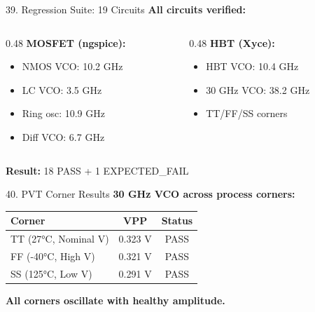 \documentclass[aspectratio=169, 11pt]{beamer}
\begin{document}
\begin{frame}{39. Regression Suite: 19 Circuits}
    \textbf{All circuits verified:}

    \vspace{0.5em}
    \begin{columns}[T]
        \begin{column}{0.48\textwidth}
            \textbf{MOSFET (ngspice):}
            \begin{itemize}
                \item NMOS VCO: 10.2 GHz
                \item LC VCO: 3.5 GHz
                \item Ring osc: 10.9 GHz
                \item Diff VCO: 6.7 GHz
            \end{itemize}
        \end{column}
        \begin{column}{0.48\textwidth}
            \textbf{HBT (Xyce):}
            \begin{itemize}
                \item HBT VCO: 10.4 GHz
                \item 30 GHz VCO: 38.2 GHz
                \item TT/FF/SS corners
            \end{itemize}
        \end{column}
    \end{columns}

    \vspace{0.5em}
    \textbf{Result:} 18 PASS + 1 EXPECTED\_FAIL
\end{frame}

\begin{frame}{40. PVT Corner Results}
    \textbf{30 GHz VCO across process corners:}

    \vspace{0.5em}
    \begin{center}
        \begin{tabular}{lcc}
            \toprule
            Corner & VPP & Status \\
            \midrule
            TT (27°C, Nominal V) & 0.323 V & PASS \\
            FF (-40°C, High V) & 0.321 V & PASS \\
            SS (125°C, Low V) & 0.291 V & PASS \\
            \bottomrule
        \end{tabular}
    \end{center}

    \vspace{0.5em}
    \textbf{All corners oscillate with healthy amplitude.}
\end{frame}
\end{document}
